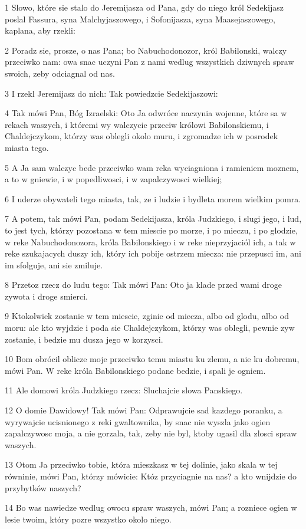 \par 1 Slowo, które sie stalo do Jeremijasza od Pana, gdy do niego król Sedekijasz poslal Fassura, syna Malchyjaszowego, i Sofonijasza, syna Maasejaszowego, kaplana, aby rzekli:
\par 2 Poradz sie, prosze, o nas Pana; bo Nabuchodonozor, król Babilonski, walczy przeciwko nam: owa snac uczyni Pan z nami wedlug wszystkich dziwnych spraw swoich, zeby odciagnal od nas.
\par 3 I rzekl Jeremijasz do nich: Tak powiedzcie Sedekijaszowi:
\par 4 Tak mówi Pan, Bóg Izraelski: Oto Ja odwróce naczynia wojenne, które sa w rekach waszych, i któremi wy walczycie przeciw królowi Babilonskiemu, i Chaldejczykom, którzy was oblegli okolo muru, i zgromadze ich w posrodek miasta tego.
\par 5 A Ja sam walczyc bede przeciwko wam reka wyciagniona i ramieniem moznem, a to w gniewie, i w popedliwosci, i w zapalczywosci wielkiej;
\par 6 I uderze obywateli tego miasta, tak, ze i ludzie i bydleta morem wielkim pomra.
\par 7 A potem, tak mówi Pan, podam Sedekijasza, króla Judzkiego, i slugi jego, i lud, to jest tych, którzy pozostana w tem miescie po morze, i po mieczu, i po glodzie, w reke Nabuchodonozora, króla Babilonskiego i w reke nieprzyjaciól ich, a tak w reke szukajacych duszy ich, który ich pobije ostrzem miecza: nie przepusci im, ani im sfolguje, ani sie zmiluje.
\par 8 Przetoz rzecz do ludu tego: Tak mówi Pan: Oto ja klade przed wami droge zywota i droge smierci.
\par 9 Ktokolwiek zostanie w tem miescie, zginie od miecza, albo od glodu, albo od moru: ale kto wyjdzie i poda sie Chaldejczykom, którzy was oblegli, pewnie zyw zostanie, i bedzie mu dusza jego w korzysci.
\par 10 Bom obrócil oblicze moje przeciwko temu miastu ku zlemu, a nie ku dobremu, mówi Pan. W reke króla Babilonskiego podane bedzie, i spali je ogniem.
\par 11 Ale domowi króla Judzkiego rzecz: Sluchajcie slowa Panskiego.
\par 12 O domie Dawidowy! Tak mówi Pan: Odprawujcie sad kazdego poranku, a wyrywajcie ucisnionego z reki gwaltownika, by snac nie wyszla jako ogien zapalczywosc moja, a nie gorzala, tak, zeby nie byl, ktoby ugasil dla zlosci spraw waszych.
\par 13 Otom Ja przeciwko tobie, która mieszkasz w tej dolinie, jako skala w tej równinie, mówi Pan, którzy mówicie: Któz przyciagnie na nas? a kto wnijdzie do przybytków naszych?
\par 14 Bo was nawiedze wedlug owocu spraw waszych, mówi Pan; a rozniece ogien w lesie twoim, który pozre wszystko okolo niego.

